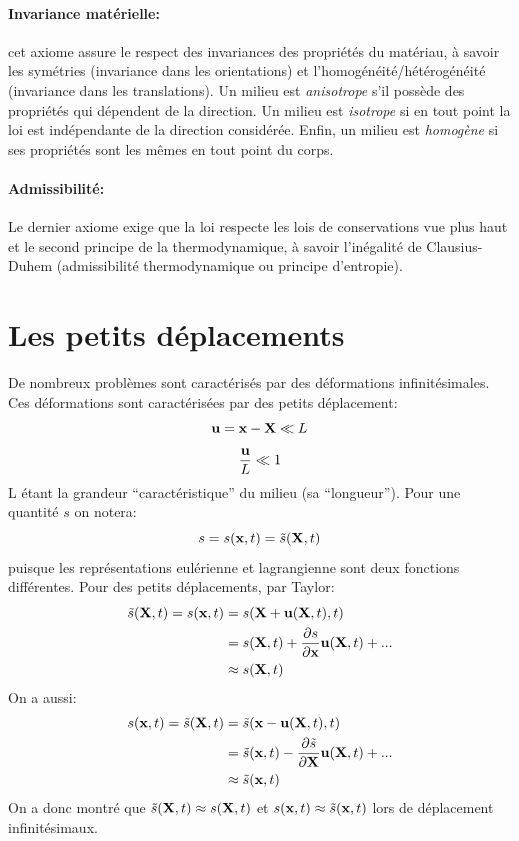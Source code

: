 \paragraph{Invariance matérielle: } cet axiome assure le respect des invariances des propriétés du matériau, à savoir les symétries (invariance dans les orientations) et  l'homogénéité/hétérogénéité (invariance dans les translations). Un milieu est \emph{anisotrope} s'il possède des propriétés qui dépendent de la direction. Un milieu est \emph{isotrope} si en tout point la loi est indépendante de la direction considérée. Enfin, un milieu est \emph{homogène} si ses propriétés sont les mêmes en tout point du corps.
\paragraph{Admissibilité: } Le dernier axiome exige que la loi respecte les lois de conservations vue plus haut et le second principe de la thermodynamique, à savoir l'inégalité de Clausius-Duhem (admissibilité thermodynamique ou principe d'entropie).

\section{Les petits déplacements}
De nombreux problèmes sont caractérisés par des déformations infinitésimales. Ces déformations sont caractérisées par des petits déplacement:
$$\textbf{u}=\textbf{x}-\textbf{X} \ll L$$ $$\frac{\textbf{u}}{L}\ll 1$$ L étant la grandeur ``caractéristique''
du milieu (sa ``longueur''). Pour une quantité $s$ on notera: $$s=s(\textbf{x},t)=\tilde{s}(\textbf{X},t)$$ puisque les représentations eulérienne et lagrangienne sont deux fonctions différentes. Pour des petits déplacements, par Taylor:
\begin{align*}
\tilde{s}(\textbf{X},t)=s(\textbf{x},t)&=s(\textbf{X}+\textbf{u}(\textbf{X},t),t)\\
 & =s(\textbf{X},t)+\frac{\partial s}{\partial \textbf{x}}\textbf{u}(\textbf{X},t)+...\\
 &\approx s(\textbf{X},t)
\end{align*}
On a aussi:
\begin{align*}
s(\textbf{x},t)=\tilde{s}(\textbf{X},t)&=\tilde{s}(\textbf{x}-\textbf{u}(\textbf{X},t),t)\\
 & =\tilde{s}(\textbf{x},t)-\frac{\partial\tilde{s}}{\partial\textbf{X}}\textbf{u}(\textbf{X},t)+...\\
 &\approx \tilde{s}(\textbf{x},t)\\
\end{align*}
On a donc montré que $\tilde{s}(\textbf{X},t)\approx s(\textbf{X},t)$ et $s(\textbf{x},t)\approx\tilde{s}(\textbf{x},t)$ lors de déplacement infinitésimaux.

